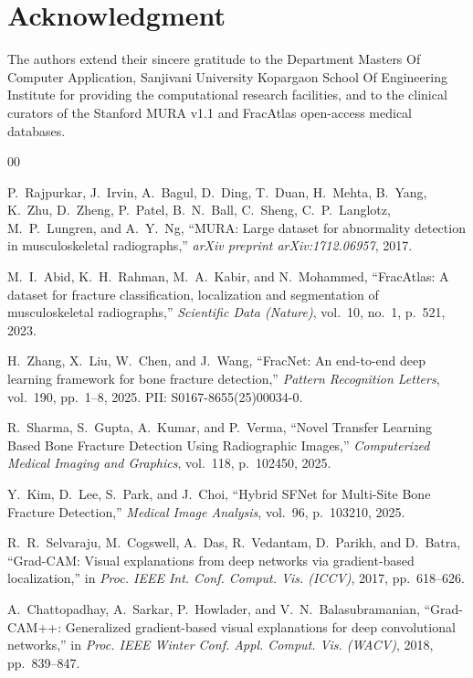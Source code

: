 \documentclass[3p,twocolumn]{elsarticle}
\begin{document}
\section*{Acknowledgment}
The authors extend their sincere gratitude to the Department Masters Of Computer Application, Sanjivani University Kopargaon School Of Engineering Institute for providing the computational research facilities, and to the clinical curators of the Stanford MURA v1.1 and FracAtlas open-access medical databases.

\begin{thebibliography}{00}

P.~Rajpurkar, J.~Irvin, A.~Bagul, D.~Ding, T.~Duan, H.~Mehta, B.~Yang, K.~Zhu, D.~Zheng, P.~Patel, B.~N.~Ball, C.~Sheng, C.~P.~Langlotz, M.~P.~Lungren, and A.~Y.~Ng, ``MURA: Large dataset for abnormality detection in musculoskeletal radiographs,'' \textit{arXiv preprint arXiv:1712.06957}, 2017.

M.~I.~Abid, K.~H.~Rahman, M.~A.~Kabir, and N.~Mohammed, ``FracAtlas: A dataset for fracture classification, localization and segmentation of musculoskeletal radiographs,'' \textit{Scientific Data (Nature)}, vol.~10, no.~1, p.~521, 2023.

H.~Zhang, X.~Liu, W.~Chen, and J.~Wang, ``FracNet: An end-to-end deep learning framework for bone fracture detection,'' \textit{Pattern Recognition Letters}, vol.~190, pp.~1--8, 2025. PII: S0167-8655(25)00034-0.

R.~Sharma, S.~Gupta, A.~Kumar, and P.~Verma, ``Novel Transfer Learning Based Bone Fracture Detection Using Radiographic Images,'' \textit{Computerized Medical Imaging and Graphics}, vol.~118, p.~102450, 2025.

Y.~Kim, D.~Lee, S.~Park, and J.~Choi, ``Hybrid SFNet for Multi-Site Bone Fracture Detection,'' \textit{Medical Image Analysis}, vol.~96, p.~103210, 2025.

R.~R.~Selvaraju, M.~Cogswell, A.~Das, R.~Vedantam, D.~Parikh, and D.~Batra, ``Grad-CAM: Visual explanations from deep networks via gradient-based localization,'' in \textit{Proc. IEEE Int. Conf. Comput. Vis. (ICCV)}, 2017, pp.~618--626.

A.~Chattopadhay, A.~Sarkar, P.~Howlader, and V.~N.~Balasubramanian, ``Grad-CAM++: Generalized gradient-based visual explanations for deep convolutional networks,'' in \textit{Proc. IEEE Winter Conf. Appl. Comput. Vis. (WACV)}, 2018, pp.~839--847.


\end{thebibliography}
\end{document}
